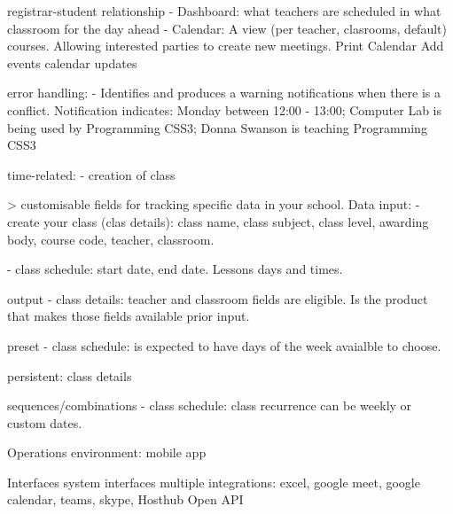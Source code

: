         registrar-student relationship
            - Dashboard: what teachers are scheduled in what classroom for the day ahead
            - Calendar: A view (per teacher, clasrooms, default) courses. Allowing interested parties to create new meetings.
                Print Calendar
                Add events
                calendar updates

    error handling:
        - Identifies and produces a warning notifications when there is a conflict. Notification indicates: Monday between 12:00 - 13:00; Computer Lab is being used by Programming CSS3; Donna Swanson is teaching Programming CSS3

    time-related:
        - creation of class


> customisable fields for tracking specific data in your school.
Data
    input:
        - create your class (clas details): class name, class subject, class level, awarding body, course code, teacher, classroom.

        - class schedule: start date, end date. Lessons days and times.

    output
        - class details: teacher and classroom fields are eligible. Is the product that makes those fields available prior input.

    preset
        - class schedule: is expected to have days of the week avaialble to choose.

    persistent:
        class details

    sequences/combinations
        - class schedule: class recurrence can be weekly or custom dates.

Operations
    environment: mobile app

Interfaces
    system interfaces
        multiple integrations: excel, google meet, google calendar, teams, skype, Hosthub Open API
